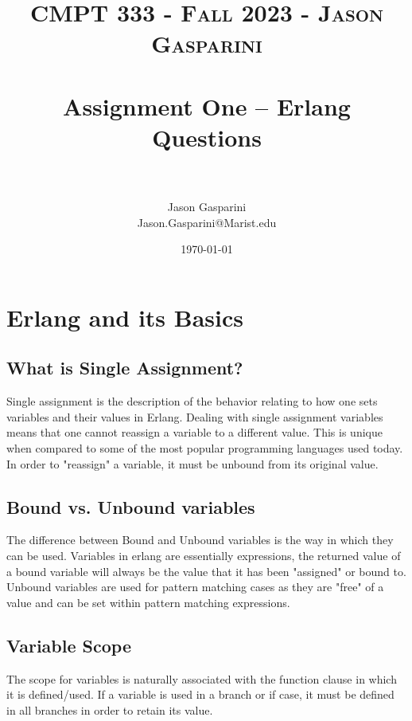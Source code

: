 \documentclass[letterpaper, 10pt]{article}
\title{	
   \normalfont \normalsize 
   \textsc{CMPT 333 - Fall 2023 - Jason Gasparini} \\[10pt] %
   \horrule{0.5pt} \\[0.25cm] 	%
   \huge Assignment One -- Erlang Questions \\     	    %
   \horrule{0.5pt} \\[0.25cm] 	%
}
\author{Jason Gasparini \\ \normalsize Jason.Gasparini@Marist.edu}
\date{\normalsize\today} 	%
\begin{document}
\maketitle %



\section{Erlang and its Basics}
\vspace{1em}

\subsection{What is Single Assignment?}

Single assignment is the description of the behavior relating to how one sets variables and their values in Erlang. Dealing with single assignment variables means that one cannot reassign a variable to a different value. This is unique when compared to some of the most popular programming languages used today. In order to "reassign" a variable, it must be unbound from its original value.

\vspace{2em}

\subsection{Bound vs. Unbound variables}

The difference between Bound and Unbound variables is the way in which they can be used. Variables in erlang are essentially expressions, the returned value of a bound variable will always be the value that it has been "assigned" or bound to. Unbound variables are used for pattern matching cases as they are "free" of a value and can be set within pattern matching expressions.
\pagebreak

\subsection{Variable Scope}

The scope for variables is naturally associated with the function clause in which it is defined/used. If a variable is used in a branch or if case, it must be defined in all branches in order to retain its value.
\end{document}
